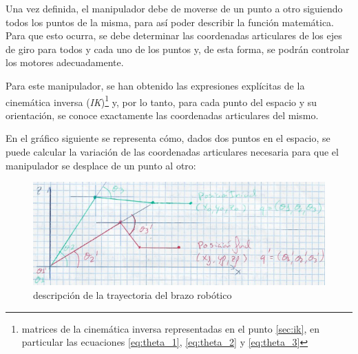 \documentclass[a4paper,12pt]{article}
\begin{document}
Una vez definida, el manipulador debe de moverse de un punto a otro siguiendo todos los puntos de la misma,
para así poder describir la función matemática. Para que esto ocurra, se debe determinar las coordenadas
articulares de los ejes de giro para todos y cada uno de los puntos y, de esta forma, se podrán controlar
los motores adecuadamente.

Para este manipulador, se han obtenido las expresiones explícitas de la cinemática inversa
(\textit{IK})\footnote{matrices de la cinemática inversa representadas en el punto 
\ref{sec:ik}, en particular las ecuaciones \ref{eq:theta_1}, \ref{eq:theta_2} y \ref{eq:theta_3}} y,
por lo tanto, para cada punto del espacio y su orientación, se conoce exactamente las coordenadas articulares del mismo.

En el gráfico siguiente se representa cómo, dados dos puntos en el espacio, se puede calcular
la variación de las coordenadas articulares necesaria para que el manipulador se desplace de un punto al otro:

\begin{figure}[H]
    \centering
    \includegraphics[width=.6\linewidth]{images/Trayectoria.png}
    \caption{descripción de la trayectoria del brazo robótico}
    \label{fig:trajectory}
\end{figure}
\end{document}
